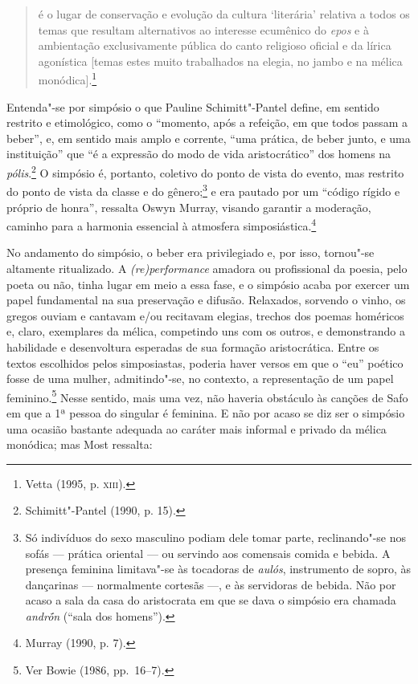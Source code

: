 \begin{quote}
é o lugar de conservação
e evolução da cultura ‘literária’ relativa a todos os temas que resultam
alternativos ao interesse ecumênico do \textit{epos} e à ambientação
exclusivamente pública do canto religioso oficial e da lírica agonística
[temas estes muito trabalhados na elegia, no jambo e na mélica monódica].\footnote{ Vetta (1995, p. \textsc{xiii}).}
\end{quote}

Entenda"-se por simpósio o que Pauline Schimitt"-Pantel define, em
sentido restrito e etimológico, como o “momento, após a refeição, em que todos
passam a beber”, e, em sentido mais amplo e corrente, “uma prática, de beber
junto, e uma instituição” que “é a expressão do modo de vida aristocrático” dos
homens na \textit{pólis}.\footnote{ Schimitt"-Pantel (1990, p. 15).} O simpósio
é, portanto, coletivo do ponto de vista do
evento, mas restrito do ponto de vista da classe e do gênero;\footnote{ Só
indivíduos do sexo masculino podiam dele tomar parte, reclinando"-se nos sofás ---
prática oriental --- ou servindo aos comensais comida e bebida. A presença
feminina limitava"-se às tocadoras de \textit{aulós}, instrumento de sopro, às
dançarinas --- normalmente cortesãs ---, e às servidoras de bebida. Não por acaso a
sala da casa do aristocrata em que se dava o simpósio era chamada
\textit{andrṓn} (“sala dos homens”).} e era pautado por um
“código rígido e próprio de honra”, ressalta Oswyn Murray, visando
garantir a moderação, caminho para a harmonia essencial à atmosfera
simposiástica.\footnote{ Murray (1990, p. 7).}

No andamento do simpósio, o beber era privilegiado e, por isso, tornou"-se
altamente ritualizado. A \textit{(re)performance} amadora ou profissional da
poesia, pelo poeta ou não, tinha lugar em meio a essa fase, e o simpósio acaba
por exercer um papel fundamental na sua preservação e difusão. Relaxados,
sorvendo o vinho, os gregos ouviam e cantavam e/ou recitavam elegias, trechos
dos poemas homéricos e, claro, exemplares da mélica, competindo uns com os
outros, e demonstrando a habilidade e desenvoltura esperadas de sua formação
aristocrática. Entre os textos escolhidos pelos simposiastas, poderia haver
versos em que o “eu” poético fosse de uma mulher, admitindo"-se, no contexto, a
representação de um papel feminino.\footnote{ Ver Bowie (1986, pp.~16--7).}
Nesse sentido, mais uma vez, não haveria obstáculo às canções de Safo em que a
1ª pessoa do singular é feminina. E não por acaso se diz ser o simpósio uma
ocasião bastante adequada ao caráter mais informal e privado da mélica
monódica; mas Most ressalta:

